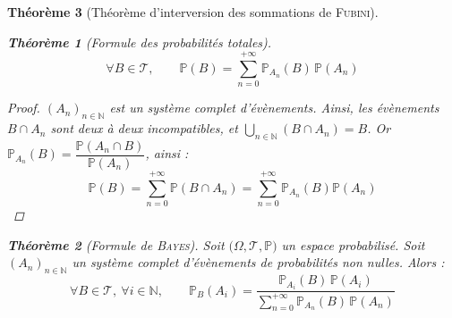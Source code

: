 \documentclass[11pt,a4paper]{report}
\newtheorem{theorem}{Théorème}[chapter]
\newtheorem{itheorem}[theorem]{Théorème}
\theoremstyle{definition}
\begin{document}
\begin{theorem}[Théorème d'interversion des sommations de \textsc{Fubini}]
{{\begin{itheorem}[Formule des probabilités totales]
\begin{equation}
     \forall B\in \mathscr{T},\qquad \mathbb{P}(B) = \sum_{n=0}^{+\infty} \mathbb{P}_{A_n}(B)\, \mathbb{P}(A_n)
     \end{equation}
\end{itheorem}
\begin{proof}
     $(A_n)_{n\in\mathbb{N}}$ est un système complet d'évènements. Ainsi, les évènements $B\cap A_n$ sont deux à deux incompatibles, et $\bigcup_{n\in\mathbb{N}} \left( B\cap A_n\right) = B$. Or $\mathbb{P}_{A_n}(B) = \dfrac{\mathbb{P}(A_n\cap B)}{\mathbb{P}(A_n)}$, ainsi : 
     \[
         \mathbb{P}(B) = \sum_{n=0}^{+\infty} \mathbb{P} \left( B\cap A_n \right)
                       = \sum_{n=0}^{+\infty} \mathbb{P}_{A_n}(B) \mathbb{P}(A_n)
     \]
\end{proof}
\begin{itheorem}[Formule de \textsc{Bayes}]
     Soit $\big( \Omega , \mathscr{T}, \mathbb{P} \big)$ un espace probabilisé. \newline
     Soit $(A_n)_{n\in\mathbb{N}}$ un \emph{système complet} d'évènements de probabilités non nulles. Alors :
     \begin{equation}
     \forall B\in \mathscr{T},\: \forall i\in \mathbb{N},\qquad \mathbb{P}_B(A_i) = \dfrac{\mathbb{P}_{A_i}(B)\,\mathbb{P}(A_i)}{\displaystyle\sum_{n=0}^{+\infty}\mathbb{P}_{A_n} (B)\, \mathbb{P}(A_n)}
     \end{equation}
\end{itheorem}

}}
\end{theorem}
\end{document}
